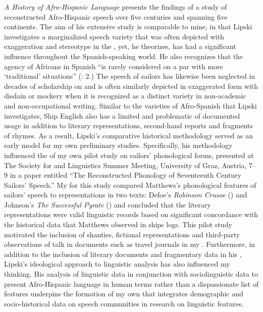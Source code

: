  \textit{A History of Afro-Hispanic Language} presents the findings of a study of reconstructed Afro-Hispanic speech over five centuries and spanning five continents. The aim of his extensive study is comparable to mine, in that Lipski investigates a marginalized speech variety that was often depicted with exaggeration and stereotype in the , yet, he theorizes, has had a significant influence throughout the Spanish-speaking world. He also recognizes that the agency of Africans in Spanish  “is rarely considered on a par with more ‘traditional’  situations” (\citealt{Lipski2005}: 2.) The speech of sailors has likewise been neglected in decades of scholarship on  and is often similarly depicted in exaggerated form with disdain or mockery when it is recognized as a distinct variety in non-academic and non-occupational writing. Similar to the varieties of Afro-Spanish that Lipski investigates, Ship English also has a limited and problematic  of documented usage in addition to literary representations, second-hand reports and fragments of rhymes. As a result, Lipski’s comparative historical methodology served as an early model for my own preliminary studies. Specifically, his methodology influenced the  of my own pilot study on  sailors’ phonological forms, presented at The Society for  and  Linguistics Summer Meeting, University of Graz, Austria, 7--9 \citealt{July2015} in a paper entitled “The Reconstructed Phonology of Seventeenth Century Sailors’ Speech.” My  for this study compared Matthews’s phonological features of  sailors’ speech to representations in two texts: Defoe’s \textit{Robinson Crusoe} (\citeyear{Defoe1719}) and Johnson’s \textit{The Successful Pyrate} (\citeyear*{Johnson1713}) and concluded that the literary representations were valid linguistic records based on significant concordance with the historical data that Matthews observed in ships logs. This pilot study motivated the inclusion of shanties, fictional representations and third-party observations of  talk in documents such as travel journals in my . Furthermore, in addition to the inclusion of literary documents and fragmentary data in his , Lipski’s ideological approach to linguistic analysis has also influenced my thinking. His analysis of linguistic data in conjunction with sociolinguistic data to present Afro-Hispanic language in human terms rather than a dispassionate list of features underpins the formation of my own  that integrates demographic and socio-historical data on speech communities in research on linguistic features.

